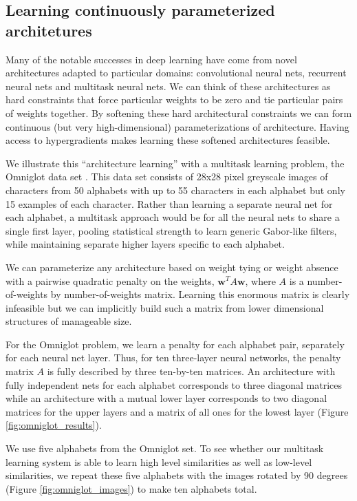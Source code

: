 \documentclass{article}
\newcommand{\vw}{\mathbf{w}}
\begin{document}
\subsection{Learning continuously parameterized architetures}

Many of the notable successes in deep learning have come from novel
architectures adapted to particular domains: convolutional neural nets,
recurrent neural nets and multitask neural nets. We can think of these
architectures as hard constraints that force particular weights to be zero and
tie particular pairs of weights together. By softening these hard architectural
constraints we can form continuous (but very high-dimensional) parameterizations
of architecture. Having access to hypergradients makes learning these
softened architectures feasible.

We illustrate this ``architecture learning'' with a multitask learning
problem, the Omniglot data set \citep{Omniglot}. This data set consists of 28x28
pixel greyscale images of characters from 50 alphabets with up to 55 characters in
each alphabet but only 15 examples of each character. Rather than learning a
separate neural net for each alphabet, a multitask approach would be for all the
neural nets to share a single first layer, pooling statistical strength to learn
generic Gabor-like filters, while maintaining separate higher layers specific to
each alphabet.

We can parameterize any architecture based on weight tying or weight absence
with a pairwise quadratic penalty on the weights, $\vw^T A \vw$, where $A$ is a
number-of-weights by number-of-weights matrix. Learning this enormous matrix is
clearly infeasible but we can implicitly build such a matrix from lower
dimensional structures of manageable size.

For the Omniglot problem, we learn a penalty for each alphabet pair, separately
for each neural net layer. Thus, for ten three-layer neural networks,
the penalty matrix $A$ is fully described by three ten-by-ten matrices. An
architecture with fully independent nets for each alphabet corresponds to three
diagonal matrices while an architecture with a mutual lower layer corresponds to
two diagonal matrices for the upper layers and a matrix of all ones
for the lowest layer (Figure \ref{fig:omniglot_results}).

We use five alphabets from the Omniglot set. To see whether our multitask
learning system is able to learn high level similarities as well as
low-level similarities, we repeat these five alphabets with the images rotated
by 90 degrees (Figure \ref{fig:omniglot_images}) to make ten alphabets total.
\end{document}
